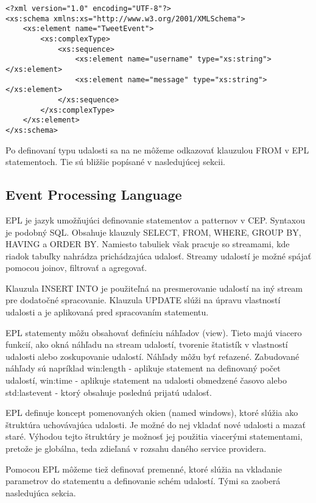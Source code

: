 	\begin{lstlisting}[label=lst:sample-schema,caption=Jednoduchý príklad XML schémy udalosti]
<?xml version="1.0" encoding="UTF-8"?>
<xs:schema xmlns:xs="http://www.w3.org/2001/XMLSchema">
	<xs:element name="TweetEvent">
		<xs:complexType>
			<xs:sequence>
				<xs:element name="username" type="xs:string"></xs:element>
				<xs:element name="message" type="xs:string"></xs:element>
			</xs:sequence>
		</xs:complexType>
	</xs:element>
</xs:schema>		
	\end{lstlisting}

	Po definovaní typu udalosti sa na ne môžeme odkazovať klauzulou FROM v EPL statementoch. Tie sú bližšie popísané v nasledujúcej sekcii.

	\subsection{Event Processing Language}
		\ac{EPL} je jazyk umožňujúci definovanie statementov a patternov v CEP. Syntaxou je podobný SQL. Obsahuje klauzuly SELECT, FROM, WHERE, GROUP BY, HAVING a ORDER BY. Namiesto tabuliek však pracuje so streamami, kde riadok tabuľky nahrádza prichádzajúca udalosť. Streamy udalostí je možné spájať pomocou joinov, filtrovať a agregovať.
		
		Klauzula INSERT INTO je použiteľná na presmerovanie udalostí na iný stream pre dodatočné spracovanie. Klauzula UPDATE slúži na úpravu vlastností udalosti a je aplikovaná pred spracovaním statementu. 
		
		EPL statementy môžu obsahovať definíciu náhľadov (view). Tieto majú viacero funkcií, ako okná náhľadu na stream udalostí, tvorenie štatistík v vlastností udalosti alebo zoskupovanie udalostí. Náhľady môžu byť reťazené. Zabudované náhľady sú napríklad win:length - aplikuje statement na definovaný počet udalostí, win:time - aplikuje statement na udalosti obmedzené časovo alebo std:lastevent - ktorý obsahuje poslednú prijatú udalosť.
		
		EPL definuje koncept pomenovaných okien (named windows), ktoré slúžia ako štruktúra uchovávajúca udalosti. Je možné do nej vkladať nové udalosti a mazať staré. Výhodou tejto štruktúry je možnosť jej použitia viacerými statementami, pretože je globálna, teda zdieľaná v rozsahu daného service providera.	
		
		Pomocou EPL môžeme tiež definovať premenné, ktoré slúžia na vkladanie parametrov do statementu a definovanie schém udalostí. Tými sa zaoberá nasledujúca sekcia.
		
